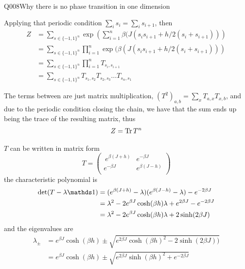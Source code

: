 \begin{entry}{Q008}{Why there is no phase transition in one dimension}

\begin{solution}[Part (a)]
Applying that periodic condition $\sum_i s_i = \sum_i s_{i+1}$, then
\begin{equation}
    \begin{split}
        Z&= \sum_{s \in \{-1,1\}^n} \exp\left(\sum_{i=1}^{n}\beta(J(s_is_{i+1} + h/2 (s_i + s_{i+1}))\right)\\
        &=\sum_{s \in \{-1,1\}^n} \prod_{i=1}^{n}\exp(\beta(J(s_is_{i+1} + h/2 (s_i + s_{i+1})))\\
        &=\sum_{s \in \{-1,1\}^n} \prod_{i=1}^{n}T_{s_i,s_{i+1}} \\
        &=
\sum_{s \in \{-1,1\}^n}T_{s_1,s_2}T_{s_2,s_3}...T_{s_n,s_1} 
    \end{split}
\end{equation}

The terms between are just matrix multiplication, $(T^2)_{a,b}= \sum_x T_{a,x}T_{x,b}$, and due to the periodic condition closing the chain, we have that the sum ends up being the trace of the resulting matrix, thus
$$Z = \operatorname{Tr}{T^n}$$

\end{solution}

\begin{solution}[Part (b)]
$T$ can be written in matrix form
\begin{equation}
   T= \begin{pmatrix}\
        e^{\beta(J+h)} & e^{-\beta J} \\
        e^{-\beta J} & e^{\beta(J-h)} \\
        \end{pmatrix}
\end{equation}
the characteristic polynomial is
\begin{equation}
\begin{split}
    \det(T -\lambda\id)&= (e^{\beta(J+h)}-\lambda)(e^{\beta(J-h)}-\lambda) - e^{-2 \beta J} \\
    &=\lambda^2 - 2e^{\beta J}\cosh(\beta h)\lambda + e^{2\beta J} - e^{-2\beta J}\\
    &=\lambda^2 - 2e^{\beta J}\cosh(\beta h)\lambda + 2\sinh(2\beta J)
\end{split} 
\end{equation}
and the eigenvalues are
\begin{equation}
\begin{split}
    \lambda_{\pm} &= e^{\beta J}\cosh(\beta h) \pm \sqrt{e^{2\beta J}\cosh(\beta h)^2 - 2 \sinh(2\beta J))}\\
    &=e^{\beta J}\cosh(\beta h) \pm \sqrt{e^{2\beta J}\sinh(\beta h)^2 + e^{-2\beta J}}
\end{split}
\end{equation}


\end{solution}
\end{entry}
